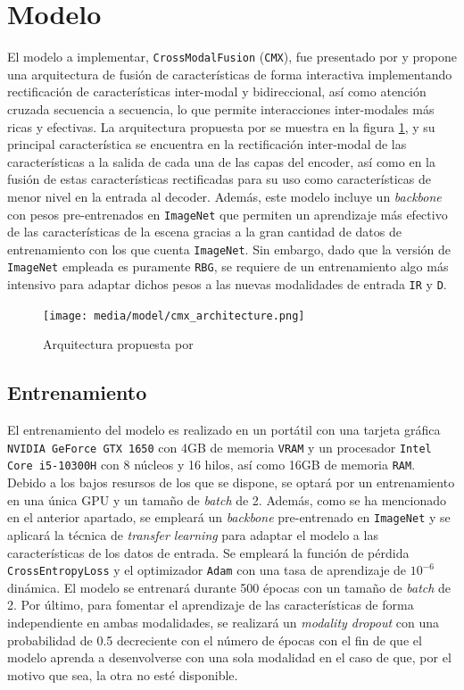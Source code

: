 \documentclass[12pt,a4paper]{report}
\begin{document}
\section{Modelo}
\label{sec:model}
El modelo a implementar, \texttt{CrossModalFusion} (\texttt{CMX}), fue presentado por \cite{zhang2023cmxcrossmodalfusionrgbx} y propone una arquitectura de fusión de características de forma interactiva implementando rectificación de características inter-modal y bidireccional, así como atención cruzada secuencia a secuencia, lo que permite interacciones inter-modales más ricas y efectivas. La arquitectura propuesta por \cite{zhang2023cmxcrossmodalfusionrgbx} se muestra en la figura \ref{fig:cmx-architecture}, y su principal característica se encuentra en la rectificación inter-modal de las características a la salida de cada una de las capas del encoder, así como en la fusión de estas características rectificadas para su uso como características de menor nivel en la entrada al decoder. Además, este modelo incluye un \textit{backbone} con pesos pre-entrenados en \texttt{ImageNet} que permiten un aprendizaje más efectivo de las características de la escena gracias a la gran cantidad de datos de entrenamiento con los que cuenta \texttt{ImageNet}. Sin embargo, dado que la versión de \texttt{ImageNet} empleada es puramente \texttt{RBG}, se requiere de un entrenamiento algo más intensivo para adaptar dichos pesos a las nuevas modalidades de entrada \texttt{IR} y \texttt{D}.
\begin{figure}
    \centering
    \texttt{[image: media/model/cmx\_architecture.png]}
    \caption{Arquitectura propuesta por \cite{zhang2023cmxcrossmodalfusionrgbx}}
    \label{fig:cmx-architecture}
\end{figure}


\subsection{Entrenamiento}
\label{subsec:training}
El entrenamiento del modelo es realizado en un portátil con una tarjeta gráfica \texttt{NVIDIA GeForce GTX 1650} con 4GB de memoria \texttt{VRAM} y un procesador \texttt{Intel Core i5-10300H} con 8 núcleos y 16 hilos, así como 16GB de memoria \texttt{RAM}. Debido a los bajos resursos de los que se dispone, se optará por un entrenamiento en una única GPU y un tamaño de \textit{batch} de 2. Además, como se ha mencionado en el anterior apartado, se empleará un \textit{backbone} pre-entrenado en \texttt{ImageNet} y se aplicará la técnica de \textit{transfer learning} para adaptar el modelo a las características de los datos de entrada. Se empleará la función de pérdida \texttt{CrossEntropyLoss} y el optimizador \texttt{Adam} con una tasa de aprendizaje de $10^{-6}$ dinámica. El modelo se entrenará durante 500 épocas con un tamaño de \textit{batch} de 2. Por último, para fomentar el aprendizaje de las características de forma independiente en ambas modalidades, se realizará un \textit{modality dropout} con una probabilidad de 0.5 decreciente con el número de épocas con el fin de que el modelo aprenda a desenvolverse con una sola modalidad en el caso de que, por el motivo que sea, la otra no esté disponible.
\end{document}
